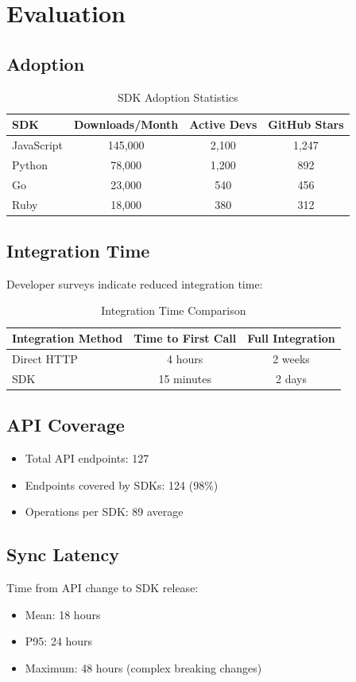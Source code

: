 \section{Evaluation}


\subsection{Adoption}

\begin{table}[h]
\centering
\caption{SDK Adoption Statistics}
\begin{tabular}{lccc}
\toprule
\textbf{SDK} & \textbf{Downloads/Month} & \textbf{Active Devs} & \textbf{GitHub Stars} \\
\midrule
JavaScript & 145,000 & 2,100 & 1,247 \\
Python & 78,000 & 1,200 & 892 \\
Go & 23,000 & 540 & 456 \\
Ruby & 18,000 & 380 & 312 \\
\bottomrule
\end{tabular}
\end{table}

\subsection{Integration Time}

Developer surveys indicate reduced integration time:

\begin{table}[h]
\centering
\caption{Integration Time Comparison}
\begin{tabular}{lcc}
\toprule
\textbf{Integration Method} & \textbf{Time to First Call} & \textbf{Full Integration} \\
\midrule
Direct HTTP & 4 hours & 2 weeks \\
SDK & 15 minutes & 2 days \\
\bottomrule
\end{tabular}
\end{table}

\subsection{API Coverage}

\begin{itemize}
    \item Total API endpoints: 127
    \item Endpoints covered by SDKs: 124 (98\%)
    \item Operations per SDK: 89 average
\end{itemize}

\subsection{Sync Latency}

Time from API change to SDK release:

\begin{itemize}
    \item Mean: 18 hours
    \item P95: 24 hours
    \item Maximum: 48 hours (complex breaking changes)
\end{itemize}

